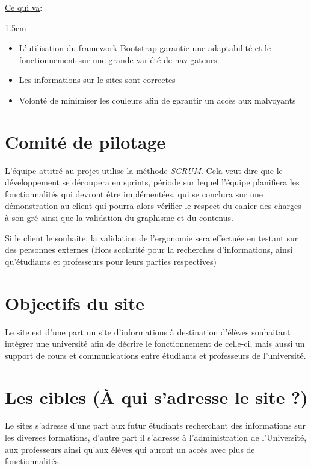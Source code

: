 \documentclass[oneside]{report}
\newcommand{\indentunder}{1.5cm}
\begin{document}
{	\par\underline{Ce qui va}:
		\vspace{.5cm}
		\begin{adjustwidth}{\indentunder}{}
		\begin{itemize}
			\item L'utilisation du framework Bootstrap garantie une adaptabilité et le fonctionnement sur une grande variété de navigateurs.
			\item Les informations sur le sites sont correctes
			\item Volonté de minimiser les couleurs afin de garantir un accès aux malvoyants
		\end{itemize}
		\end{adjustwidth}
\newpage
		\section{Comité de pilotage}
		{
			\par L’équipe attitré au projet utilise la méthode \textit{SCRUM}. Cela veut dire que le développement se découpera en sprints, période sur lequel l’équipe planifiera les fonctionnalités qui devront être implémentées, qui se conclura sur une démonstration au client qui pourra alors vérifier le respect du cahier des charges à son gré ainsi que la validation du graphisme et du contenus.
			\vspace{.5cm}
			\par Si le client le souhaite, la validation de l’ergonomie sera effectuée en testant sur des personnes externes (Hors scolarité pour la recherches d’informations, ainsi qu’étudiants et professeurs pour leurs parties respectives)

		}
		\section{Objectifs du site}
		{
			Le site est d’une part un site d’informations à destination d’élèves souhaitant intégrer une université afin de décrire le fonctionnement de celle-ci, mais aussi un support de cours et communications entre étudiants et professeurs de l’université.
		}
		
		\section{Les cibles (À qui s'adresse le site ?)}
		\par Le sites s'adresse d'une part aux futur étudiants recherchant des informations sur les diverses formations, d'autre part il s'adresse à l'administration de l'Université, aux professeurs ainsi qu'aux élèves qui auront un accès avec plus de fonctionnalités.

}
\end{document}

